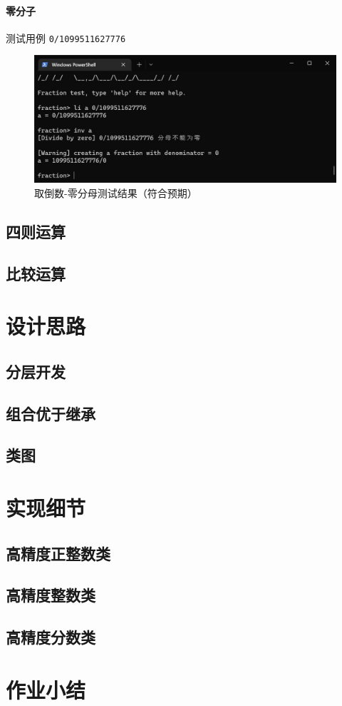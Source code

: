 \documentclass[cn,black,12pt,normal]{elegantnote}
\begin{document}
\paragraph{零分子} 测试用例 \lstinline{0/1099511627776}
\begin{figure}[H]
    \centering
    \includegraphics[width=.8\textwidth]{imgs/test_inv_zero2.jpg}
    \caption{取倒数-零分母测试结果（符合预期）}
\end{figure}

\subsection{四则运算}

\subsection{比较运算}

\section{设计思路}

\subsection{分层开发}

\subsection{组合优于继承}

\subsection{类图}

\section{实现细节}

\subsection{高精度正整数类}

\subsection{高精度整数类}

\subsection{高精度分数类}

\section{作业小结}
\end{document}
